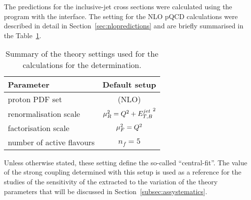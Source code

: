 The predictions for the inclusive-jet cross sections were calculated using the \nlojet program with the \fastnlo interface. The setting for the NLO pQCD calculations were described in detail in Section~\ref{sec:nlopredictions} and are briefly summarised in the Table~\ref{tab:nlosettings}.
\begin{table}[h]
\centering
\begin{tabular}{l|c}
Parameter  & Default setup \\ 
\hline \hline proton PDF set & \herapdf1.5 (NLO) \\
\hline renormalisation scale & $\mu_R^2=\mbox{${Q^2}$} + \mbox{$E_{T,B}^{jet}$}^2$ \\ 
\hline factorisation scale          & $\mu_F^2=\mbox{${Q^2}$} $ \\ 
\hline number of active flavours    & $n_f = 5 $ \\ 
\end{tabular} 
\caption{Summary of the theory settings used for the calculations for the \as determination.}
\label{tab:nlosettings}
\end{table}
Unless otherwise stated, these setting define the so-called ``central-fit''. The value of the strong coupling determined with this setup is used as a reference for the studies of the sensitivity of the extracted \asz to the variation of the theory parameters that will be discussed in Section~\ref{subsec:assystematics}.

